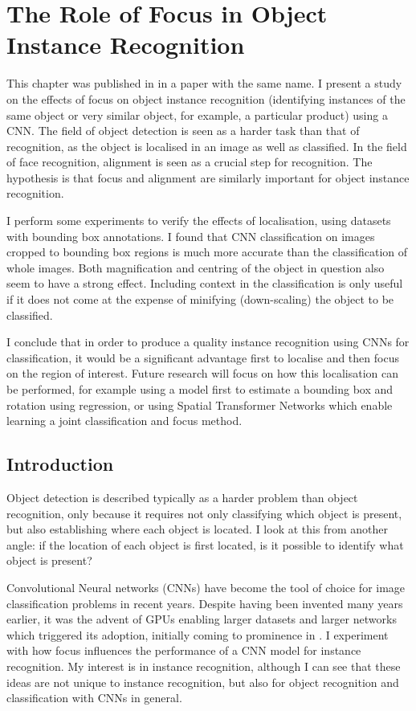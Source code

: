 \chapter{The Role of Focus in Object Instance Recognition}
\label{chap:focus}

This chapter was published in \cite{Batchelor2017} in a paper with the same name. I present a study on the effects of focus on object instance recognition (identifying instances of the same object or very similar object, for example, a particular product) using a \gls{CNN}. The field of object detection is seen as a harder task than that of recognition, as the object is localised in an image as well as classified. In the field of face recognition, alignment is seen as a crucial step for recognition. The hypothesis is that focus and alignment are similarly important for object instance recognition. 

I perform some experiments to verify the effects of localisation, using datasets with bounding box annotations. I found that CNN classification on images cropped to bounding box regions is much more accurate than the classification of whole images. Both magnification and centring of the object in question also seem to have a strong effect. Including context in the classification is only useful if it does not come at the expense of minifying (down-scaling) the object to be classified.
 
I conclude that in order to produce a quality instance recognition using \gls{CNN}s for classification, it would be a significant advantage first to localise and then focus on the region of interest. Future research will focus on how this localisation can be performed, for example using a model first to estimate a bounding box and rotation using regression, or using Spatial Transformer Networks which enable learning a joint classification and focus method.

\section{Introduction}

Object detection is described typically as a harder problem than object recognition, only because it requires not only classifying which object is present, but also establishing where each object is located. I look at this from another angle: if the location of each object is first located, is it possible to identify what object is present? 

Convolutional Neural networks (\gls{CNN}s) \cite{LeCun1998} have become the tool of choice for image classification problems in recent years. Despite having been invented many years earlier, it was the advent of \gls{GPU}s enabling larger datasets and larger networks which triggered its adoption, initially coming to prominence in \cite {Krizhevsky2012}.  I experiment with how focus influences the performance of a CNN model for instance recognition. My interest is in instance recognition, although I can see that these ideas are not unique to instance recognition, but also for object recognition and classification with \gls{CNN}s in general.

